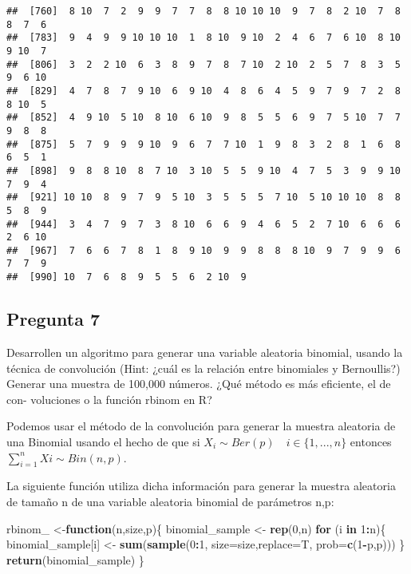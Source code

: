 \documentclass[]{article}
\newenvironment{Shaded}{\begin{snugshade}}{\end{snugshade}}
\newcommand{\ControlFlowTok}[1]{\textcolor[rgb]{0.13,0.29,0.53}{\textbf{#1}}}
\newcommand{\DataTypeTok}[1]{\textcolor[rgb]{0.13,0.29,0.53}{#1}}
\newcommand{\DecValTok}[1]{\textcolor[rgb]{0.00,0.00,0.81}{#1}}
\newcommand{\KeywordTok}[1]{\textcolor[rgb]{0.13,0.29,0.53}{\textbf{#1}}}
\newcommand{\NormalTok}[1]{#1}
\newcommand{\OperatorTok}[1]{\textcolor[rgb]{0.81,0.36,0.00}{\textbf{#1}}}
\newcommand{\StringTok}[1]{\textcolor[rgb]{0.31,0.60,0.02}{#1}}
\begin{document}
\begin{verbatim}
##  [760]  8 10  7  2  9  9  7  7  8  8 10 10 10  9  7  8  2 10  7  8  8  7  6
##  [783]  9  4  9  9 10 10 10  1  8 10  9 10  2  4  6  7  6 10  8 10  9 10  7
##  [806]  3  2  2 10  6  3  8  9  7  8  7 10  2 10  2  5  7  8  3  5  9  6 10
##  [829]  4  7  8  7  9 10  6  9 10  4  8  6  4  5  9  7  9  7  2  8  8 10  5
##  [852]  4  9 10  5 10  8 10  6 10  9  8  5  5  6  9  7  5 10  7  7  9  8  8
##  [875]  5  7  9  9  9 10  9  6  7  7 10  1  9  8  3  2  8  1  6  8  6  5  1
##  [898]  9  8  8 10  8  7 10  3 10  5  5  9 10  4  7  5  3  9  9 10  7  9  4
##  [921] 10 10  8  9  7  9  5 10  3  5  5  5  7 10  5 10 10 10  8  8  5  8  9
##  [944]  3  4  7  9  7  3  8 10  6  6  9  4  6  5  2  7 10  6  6  6  2  6 10
##  [967]  7  6  6  7  8  1  8  9 10  9  9  8  8  8 10  9  7  9  9  6  7  7  9
##  [990] 10  7  6  8  9  5  5  6  2 10  9
\end{verbatim}

\hypertarget{pregunta-7}{%
\subsection{Pregunta 7}\label{pregunta-7}}

Desarrollen un algoritmo para generar una variable aleatoria binomial,
usando la técnica de convolución (Hint: ¿cuál es la relación entre
binomiales y Bernoullis?) Generar una muestra de 100,000 números. ¿Qué
método es más eficiente, el de con- voluciones o la función rbinom en R?

Podemos usar el método de la convolución para generar la muestra
aleatoria de una Binomial usando el hecho de que si
\(X_i \sim Ber(p) \quad i\in\{1,...,n\}\) entonces
\(\sum_{i=1}^n Xi \sim Bin(n,p)\).

La siguiente función utiliza dicha información para generar la muestra
aleatoria de tamaño n de una variable aleatoria binomial de parámetros
n,p:

\begin{Shaded}
\begin{Highlighting}[]
\NormalTok{rbinom_ <-}\ControlFlowTok{function}\NormalTok{(n,size,p)\{}
\NormalTok{  binomial_sample <-}\StringTok{ }\KeywordTok{rep}\NormalTok{(}\DecValTok{0}\NormalTok{,n)}
  \ControlFlowTok{for}\NormalTok{ (i }\ControlFlowTok{in} \DecValTok{1}\OperatorTok{:}\NormalTok{n)\{}
\NormalTok{    binomial_sample[i] <-}\StringTok{ }\KeywordTok{sum}\NormalTok{(}\KeywordTok{sample}\NormalTok{(}\DecValTok{0}\OperatorTok{:}\DecValTok{1}\NormalTok{, }\DataTypeTok{size=}\NormalTok{size,}\DataTypeTok{replace=}\NormalTok{T, }\DataTypeTok{prob=}\KeywordTok{c}\NormalTok{(}\DecValTok{1}\OperatorTok{-}\NormalTok{p,p)))}
\NormalTok{  \}}
  \KeywordTok{return}\NormalTok{(binomial_sample)}
\NormalTok{\}}
\end{Highlighting}
\end{Shaded}
\end{document}

